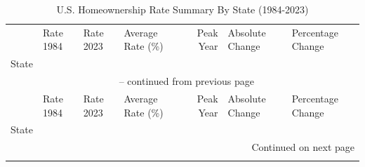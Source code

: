 \begin{longtable}{llllrll}
\caption{U.S. Homeownership Rate Summary By State (1984-2023)}
\label{tab:homeownership_state_summary} \\

\toprule
 & Rate 1984 & Rate 2023 & Average Rate (\%) & Peak Year & Absolute Change & Percentage Change \\
State &  &  &  &  &  &  \\
\midrule
\endfirsthead

\multicolumn{7}{c}{{\tablename\ \thetable{} -- continued from previous page}} \\
\toprule
 & Rate 1984 & Rate 2023 & Average Rate (\%) & Peak Year & Absolute Change & Percentage Change \\
State &  &  &  &  &  &  \\
\midrule
\endhead

\midrule
\multicolumn{7}{r}{{Continued on next page}} \\
\endfoot

\bottomrule
\endlastfoot


\end{longtable}
